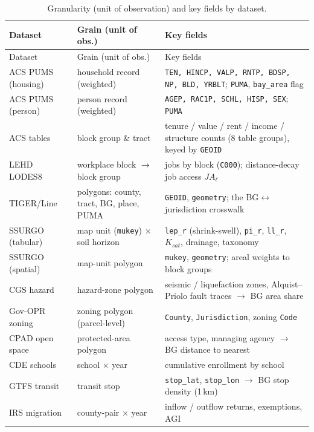 \documentclass[11pt]{article}
\begin{document}
\begin{center}
\footnotesize
\setlength{\tabcolsep}{4pt}
\renewcommand{\arraystretch}{1.2}
\begin{longtable}{p{2.5cm} p{3.3cm} p{8.4cm}}
\caption{Granularity (unit of observation) and key fields by dataset.}
\label{tab:grain}\\
\toprule
Dataset & Grain (unit of obs.) & Key fields \\
\midrule
\endfirsthead
\toprule
Dataset & Grain (unit of obs.) & Key fields \\
\midrule
\endhead
\bottomrule
\endfoot
\bottomrule
\endlastfoot
ACS PUMS (housing) & household record (weighted) & \texttt{TEN, HINCP, VALP, RNTP, BDSP, NP, BLD, YRBLT}; \texttt{PUMA}, \texttt{bay\_area} flag \\
ACS PUMS (person) & person record (weighted) & \texttt{AGEP, RAC1P, SCHL, HISP, SEX}; \texttt{PUMA} \\
ACS tables & block group \& tract & tenure / value / rent / income / structure counts (8 table groups), keyed by \texttt{GEOID} \\
LEHD LODES8 & workplace block $\to$ block group & jobs by block (\texttt{C000}); distance-decay job access $JA_\ell$ \\
TIGER/Line & polygons: county, tract, BG, place, PUMA & \texttt{GEOID}, \texttt{geometry}; the BG$\leftrightarrow$jurisdiction crosswalk \\
SSURGO (tabular) & map unit (\texttt{mukey}) $\times$ soil horizon & \texttt{lep\_r} (shrink-swell), \texttt{pi\_r}, \texttt{ll\_r}, $K_{sat}$, drainage, taxonomy \\
SSURGO (spatial) & map-unit polygon & \texttt{mukey}, \texttt{geometry}; areal weights to block groups \\
CGS hazard & hazard-zone polygon & seismic / liquefaction zones, Alquist--Priolo fault traces $\to$ BG area share \\
Gov-OPR zoning & zoning polygon (parcel-level) & \texttt{County}, \texttt{Jurisdiction}, zoning \texttt{Code} \\
CPAD open space & protected-area polygon & access type, managing agency $\to$ BG distance to nearest \\
CDE schools & school $\times$ year & cumulative enrollment by school \\
GTFS transit & transit stop & \texttt{stop\_lat}, \texttt{stop\_lon} $\to$ BG stop density (1\,km) \\
IRS migration & county-pair $\times$ year & inflow / outflow returns, exemptions, AGI \\

\end{longtable}
\end{center}
\end{document}
